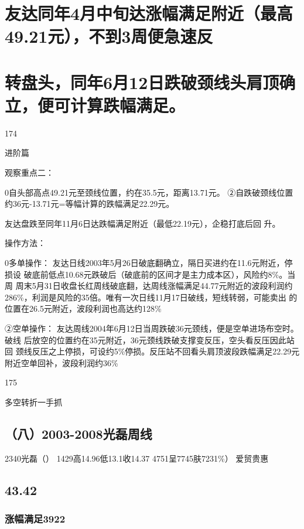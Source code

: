 \documentclass{article}
\begin{document}
\section{友达同年4月中旬达涨幅满足附近（最高49.21元），不到3周便急速反}

\section{转盘头，同年6月12日跌破颈线头肩顶确立，便可计算跌幅满足。}

174

\clearpage

进阶篇

观察重点二：

0自头部高点49.21元至颈线位置，约在35.5元，距离13.71元。 ②自跌破颈线位置约36元-13.71元=等幅计算的跌幅满足22.29元。

友达盘跌至同年11月6日达跌幅满足附近（最低22.19元），企稳打底后回 升。

操作方法：

0多单操作： 友达日线2003年5月26日破底翻确立，隔日买进约在11.6元附近，停损设 破底前低点10.68元跌破后（破底前的区间才是主力成本区），风险约8\%。当周 周末5月31日收盘长红周线破底翻，达周线涨幅满足44.77元附近的波段利润约 286\%，利润是风险的35倍。唯有一次日线11月17日破线，短线转弱，可能卖出 的位置在26.5元附近，波段利润也高达约128\%

②空单操作： 友达周线2004年6月12日当周跌破36元颈线，便是空单进场布空时。破线 后放空的位置约在35元附近，36元颈线跌破支撑变反压，空头看反压因此站回 颈线反压之上停损，可设约5\%停损。反压站不回看头肩顶波段跌幅满足22.29元 附近空单回补，波段利润约36\%

175

\clearpage

多空转折一手抓

\subsection{（八）2003-2008光磊周线}

2340光磊（） 1429高14.96低13.1收14.37 4751呈7745肤7231\%） 爱贸贵惠

\subsection{43.42}

\subsubsection{涨幅满足3922}
\end{document}
